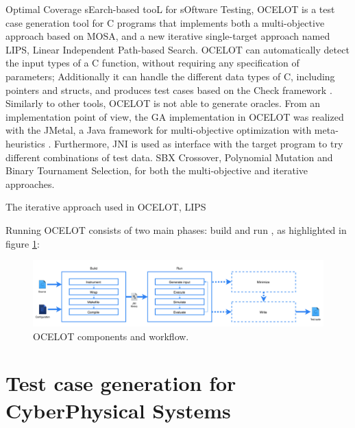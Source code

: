 Optimal Coverage sEarch-based tooL for sOftware Testing, OCELOT \cite{DBLP:conf/ssbse/ScalabrinoGNOL16} is a test case generation tool for C programs that implements both a multi-objective approach based on MOSA, and a new iterative single-target approach named LIPS, Linear Independent Path-based Search.
OCELOT can automatically detect the input types of a C function, without requiring any specification of parameters; Additionally it can handle the different data types of C, including pointers and structs, and produces test cases based on the Check framework \cite{Check}.
Similarly to other tools, OCELOT is not able to generate oracles.
From an implementation point of view, the GA implementation in OCELOT was realized with the JMetal, a Java framework for multi-objective optimization with meta-heuristics \cite{JMetal}. Furthermore, JNI is used as interface with the target program to try different combinations of test data.
SBX Crossover, Polynomial Mutation and Binary Tournament Selection, for both the multi-objective and iterative approaches.

The iterative approach used in OCELOT, LIPS

Running OCELOT consists of two main phases: build and run \cite{DBLP:conf/kbse/ScalabrinoGNGLG18}, as highlighted in figure \ref{fig:OCELOT main loop}:

\begin{figure}[!h]
    \centering
    \includegraphics[scale=0.35]{figures/OCELOT_workflow.PNG}
    \caption{OCELOT components and workflow.}
    \label{fig:OCELOT main loop}
\end{figure}





\newpage
\section{Test case generation for CyberPhysical Systems}

\cite{DBLP:journals/infsof/HumeniukKA22}
